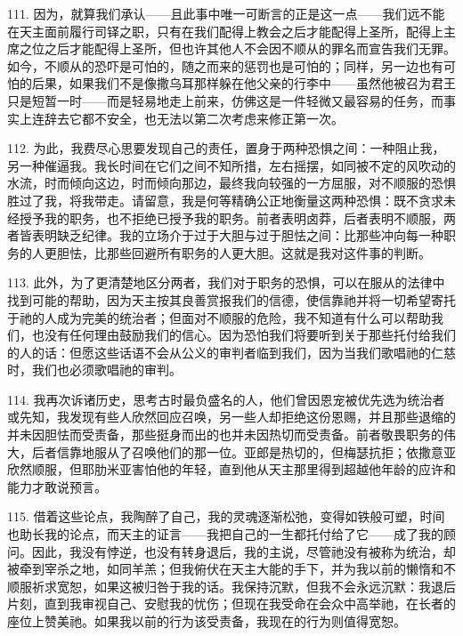 111. 因为，就算我们承认——且此事中唯一可断言的正是这一点——我们远不能在天主面前履行司铎之职，只有在我们配得上教会之后才能配得上圣所，配得上主席之位之后才能配得上圣所，但也许其他人不会因不顺从的罪名而宣告我们无罪。如今，不顺从的恐吓是可怕的，随之而来的惩罚也是可怕的；同样，另一边也有可怕的后果，如果我们不是像撒乌耳那样躲在他父亲的行李中——虽然他被召为君王只是短暂一时——而是轻易地走上前来，仿佛这是一件轻微又最容易的任务，而事实上连辞去它都不安全，也无法以第二次考虑来修正第一次。\par

112. 为此，我费尽心思要发现自己的责任，置身于两种恐惧之间：一种阻止我，另一种催逼我。我长时间在它们之间不知所措，左右摇摆，如同被不定的风吹动的水流，时而倾向这边，时而倾向那边，最终我向较强的一方屈服，对不顺服的恐惧胜过了我，将我带走。请留意，我是何等精确公正地衡量这两种恐惧：既不贪求未经授予我的职务，也不拒绝已授予我的职务。前者表明卤莽，后者表明不顺服，两者皆表明缺乏纪律。我的立场介于过于大胆与过于胆怯之间：比那些冲向每一种职务的人更胆怯，比那些回避所有职务的人更大胆。这就是我对这件事的判断。\par

113. 此外，为了更清楚地区分两者，我们对于职务的恐惧，可以在服从的法律中找到可能的帮助，因为天主按其良善赏报我们的信德，使信靠祂并将一切希望寄托于祂的人成为完美的统治者；但面对不顺服的危险，我不知道有什么可以帮助我们，也没有任何理由鼓励我们的信心。因为恐怕我们将要听到关于那些托付给我们的人的话：但愿这些话语不会从公义的审判者临到我们，因为当我们歌唱祂的仁慈时，我们也必须歌唱祂的审判。\par

114. 我再次诉诸历史，思考古时最负盛名的人，他们曾因恩宠被优先选为统治者或先知，我发现有些人欣然回应召唤，另一些人却拒绝这份恩赐，并且那些退缩的并未因胆怯而受责备，那些挺身而出的也并未因热切而受责备。前者敬畏职务的伟大，后者信靠地服从了召唤他们的那一位。亚郎是热切的，但梅瑟抗拒；依撒意亚欣然顺服，但耶肋米亚害怕他的年轻，直到他从天主那里得到超越他年龄的应许和能力才敢说预言。\par

115. 借着这些论点，我陶醉了自己，我的灵魂逐渐松弛，变得如铁般可塑，时间也助长我的论点，而天主的证言——我把自己的一生都托付给了它——成了我的顾问。因此，我没有悖逆，也没有转身退后，我的主说，尽管祂没有被称为统治，却被牵到宰杀之地，如同羊羔；但我俯伏在天主大能的手下，并为我以前的懒惰和不顺服祈求宽恕，如果这被归咎于我的话。我保持沉默，但我不会永远沉默：我退后片刻，直到我审视自己、安慰我的忧伤；但现在我受命在会众中高举祂，在长者的座位上赞美祂。如果我以前的行为该受责备，我现在的行为则值得宽恕。\par

